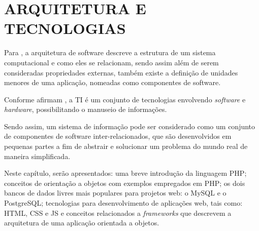 \chapter{ARQUITETURA E TECNOLOGIAS}
\label{tecnologias}
 
Para , a arquitetura de software descreve a
estrutura de um sistema computacional e como eles se relacionam, sendo assim 
além de serem consideradas propriedades externas, também existe a definição de
unidades menores de uma aplicação, nomeadas como componentes de software.

Conforme afirmam
, a  \ac{TI} é um
conjunto de tecnologias envolvendo \textit{software} e \textit{hardware}, 
possibilitando o manuseio  de informações.

Sendo assim, um sistema de informação pode ser considerado como um conjunto de
componentes de software inter-relacionados, que são desenvolvidos em pequenas 
partes a fim de abstrair e solucionar um problema do mundo real de maneira 
simplificada.
 
Neste capítulo, serão apresentados: uma breve introdução da linguagem \acs{PHP};
conceitos de orientação a objetos com exemplos empregados em \acs{PHP}; os 
dois bancos de dados livres mais populares para projetos web: o
\acs{MySQL} e o \acs{PostgreSQL}; tecnologias para desenvolvimento de aplicações
web, tais como: \acs{HTML}, \acs{CSS} e \acs{JS} e conceitos relacionados a
\textit{frameworks} que descrevem a arquitetura de uma aplicação orientada a
objetos.







